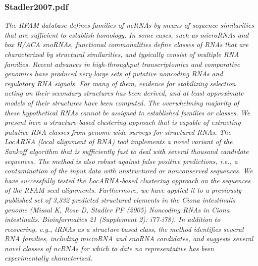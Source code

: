 \subsubsection{Stadler2007.pdf}
\cite{Will2007}
\textit{The RFAM database defines families of ncRNAs by means of sequence similarities that are sufficient to establish homology. In some cases, such as microRNAs and box H/ACA snoRNAs, functional commonalities define classes of RNAs that are characterized by structural similarities, and typically consist of multiple RNA families. Recent advances in high-throughput transcriptomics and comparative genomics have produced very large sets of putative noncoding RNAs and regulatory RNA signals. For many of them, evidence for stabilizing selection acting on their secondary structures has been derived, and at least approximate models of their structures have been computed. The overwhelming majority of these hypothetical RNAs cannot be assigned to established families or classes. We present here a structure-based clustering approach that is capable of extracting putative RNA classes from genome-wide surveys for structured RNAs. The LocARNA (local alignment of RNA) tool implements a novel variant of the Sankoff algorithm that is sufficiently fast to deal with several thousand candidate sequences. The method is also robust against false positive predictions, i.e., a contamination of the input data with unstructured or nonconserved sequences. We have successfully tested the LocARNA-based clustering approach on the sequences of the RFAM-seed alignments. Furthermore, we have applied it to a previously published set of 3,332 predicted structured elements in the Ciona intestinalis genome (Missal K, Rose D, Stadler PF (2005) Noncoding RNAs in Ciona intestinalis. Bioinformatics 21 (Supplement 2): i77-i78). In addition to recovering, e.g., tRNAs as a structure-based class, the method identifies several RNA families, including microRNA and snoRNA candidates, and suggests several novel classes of ncRNAs for which to date no representative has been experimentally characterized.}

